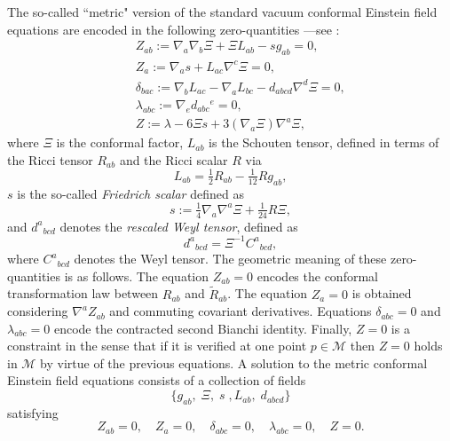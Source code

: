 \documentclass[10pt,a4paper]{article}
\theoremstyle{plain}
\begin{document}
The so-called ``metric" version of the standard vacuum conformal Einstein field
equations are encoded in the following zero-quantities ---see
\cite{Fri81a,Fri81b,Fri82,Fri83}:
\begin{subequations}\label{CFE_tensor_zeroquants}
\begin{eqnarray}
&& Z_{ab} := \nabla_{a}\nabla_{b}\Xi +\Xi L_{ab} - s g_{ab}=0 ,
 \label{StandardCEFEsecondderivativeCF}\\
&& Z_{a} := \nabla_{a}s +L_{ac} \nabla ^{c}\Xi=0
 , \label{standardCEFEs}\\ && \delta_{bac} :=
 \nabla_{b}L_{ac}-\nabla_{a}L_{bc} - d_{abcd}\nabla^d{}\Xi =0
 , \label{standardCEFESchouten}\\ && \lambda_{abc}:=
 \nabla_{e}d_{abc}{}^{e}=0 , \label{standardCEFErescaledWeyl}\\ && Z
 := \lambda - 6 \Xi s + 3 (\nabla_{a}\Xi) \nabla^{a}\Xi,
\label{standardCFEconstraintFriedrichScalar}
\end{eqnarray}
\end{subequations}
where $\Xi$ is the conformal factor, $L_{ab}$ is the Schouten tensor,
defined in terms of the Ricci tensor $R_{ab}$ and the Ricci scalar $R$
via
\begin{equation}\label{SchoutenDefinition}
L_{ab}=\tfrac{1}{2}R_{ab}-\tfrac{1}{12}Rg_{ab},
\end{equation}
 $s$ is the so-called \emph{Friedrich scalar} defined as
\begin{equation}\label{s-definition}
s:= \tfrac{1}{4}\nabla_{a}\nabla^{a}\Xi + \tfrac{1}{24}R\Xi,
\end{equation}
and $d^{a}{}_{bcd}$ denotes the \emph{rescaled Weyl tensor}, defined
as
\[d^{a}{}_{bcd}=\Xi^{-1}C^{a}{}_{bcd},\]
where $C^{a}{}_{bcd}$ denotes the Weyl tensor.  The geometric meaning
of these zero-quantities is as follows. The equation $Z_{ab}=0$
encodes the conformal transformation law between ${R}_{ab}$ and
$\tilde{R}_{ab}$.  The equation $Z_{a}=0$ is obtained considering
$\nabla^{a}Z_{ab}$ and commuting covariant derivatives.  Equations
$\delta_{abc}=0$ and $\lambda_{abc}=0$ encode the contracted second
Bianchi identity. Finally, $Z=0$ is a constraint in the sense that if
it is verified at one point $p\in\mathcal{M}$ then $Z=0$ holds in
$\mathcal{M}$ by virtue of the previous equations.  A solution to the
metric conformal Einstein field equations consists of a collection of
fields
\[
\{g_{ab}, \; \Xi, \; s\;,L_{ab},\; d_{abcd}\}
\]
satisfying
\begin{equation}\label{vanishing_CFEs_tensorial_zq}
  Z_{ab}=0, \quad Z_{a}=0, \quad \delta_{abc}=0, \quad \lambda_{abc}=0, \quad Z=0.
\end{equation}
\end{document}
